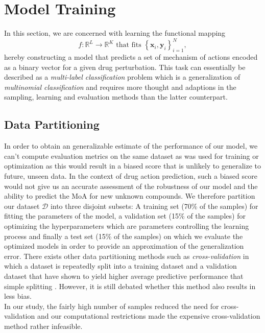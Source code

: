 \documentclass[bsc,frontabs,twoside,singlespacing,parskip,deptreport]{infthesis}     %
\let\Oldsection\section
\renewcommand{\section}{\FloatBarrier\Oldsection}
\let\Oldsubsection\subsection
\renewcommand{\subsection}{\FloatBarrier\Oldsubsection}
\begin{document}
\section{Model Training}\label{moaprediction}
In this section, we are concerned with learning the functional mapping \[f: \mathbb{R}^{L} \rightarrow \mathbb{R}^{K} \text { that fits }\left\{\mathbf{x}_{i}, \mathbf{y}_{i}\right\}_{i=1}^{N},\] hereby constructing a model that predicts a set of mechanism of actions encoded as a binary vector for a given drug perturbation. 
This task can essentially be described as a \textit{multi-label classification} problem which is a generalization of \textit{multinomial classification} and requires more thought and adaptions in the sampling, learning and evaluation methods than the latter counterpart.\\
\subsection{Data Partitioning}
In order to obtain an generalizable estimate of the performance of our model, we can't compute evaluation metrics on the same dataset as was used for training or optimization as this would result in a biased score that is unlikely to generalize to future, unseen data. In the context of drug action prediction, such a biased score would not give us an accurate assessment of the robustness of our model and the ability to predict the MoA for new unknown compounds. 
We therefore partition our dataset \(\mathscr{D}\) into three disjoint subsets: A training set (70\% of the samples) for fitting the parameters of the model, a validation set (15\% of the samples) for optimizing the hyperparameters which are parameters controlling the learning process and finally a test set (15\% of the samples) on which we evaluate the optimized models in order to provide an approximation of the generalization error.
There exists other data partitioning methods such as \textit{cross-validation} in which a dataset is repeatedly split into a training dataset and a validation dataset that have shown to yield higher average predictive performance that simple splitting \cite{schaffer_selecting_1993}. However, it is still debated whether this method also results in less bias. \\
In our study, the fairly high number of samples reduced the need for cross-validation and our computational restrictions made the expensive cross-validation method rather infeasible. \\
\end{document}
